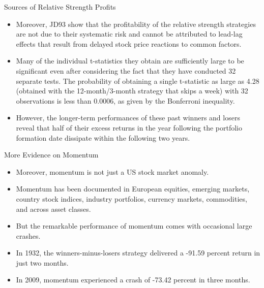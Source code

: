 \documentclass{beamer}
\begin{document}
\begin{frame}{Sources of Relative Strength Profits}
    \begin{itemize}
        \item Moreover, JD93 show that the profitability of the relative strength strategies are not due to their systematic risk and cannot be attributed to lead-lag effects that result from delayed stock price reactions to common factors.
        \item Many of the individual t-statistics they obtain are sufficiently large to be significant even after considering the fact that they have conducted 32 separate tests. The probability of obtaining a single t-statistic as large as 4.28 (obtained with the 12-month/3-month strategy that skips a week) with 32 observations is less than 0.0006, as given by the Bonferroni inequality.
        \item However, the longer-term performances of these past winners and losers reveal that half of their excess returns in the year following the portfolio formation date dissipate within the following two years.
    \end{itemize}
\end{frame}

\begin{frame}{More Evidence on Momentum}
    \begin{itemize}
        \item Moreover, momentum is not just a US stock market anomaly.
        \item Momentum has been documented in European equities, emerging markets, country stock indices, industry portfolios, currency markets, commodities, and across asset classes.
        \item But the remarkable performance of momentum comes with occasional large crashes.
        \item In 1932, the winners-minus-losers strategy delivered a -91.59 percent return in just two months.
        \item In 2009, momentum experienced a crash of -73.42 percent in three months.
    \end{itemize}
\end{frame}
\end{document}
